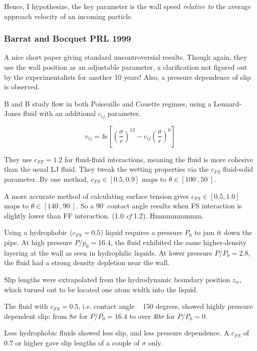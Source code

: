 \documentclass[twocolumn]{article}
\begin{document}
Hence, I hypothesize, the key parameter is the wall speed \emph{relative to} the average approach velocity of an incoming particle. 



\subsubsection*{Barrat and Bocquet PRL 1999}
A nice short paper giving standard uncontroversial results.  Though again, they use the wall position as an adjustable parameter, a clarification not figured out by the experimentalists for another 10 years! Also, a pressure dependence of slip is observed.

B and B study flow in both Poiseuille and Couette regimes, using a Lennard-Jones fluid with an additional $c_{ij}$ parameter.

\[ v_{ij} = 4 \epsilon \left[ \left( \frac{\sigma}{r}\right)^{12} -
    c_{ij} \left( \frac{\sigma}{r} \right)^{6} \right] \]

They use $c_{FF} = 1.2$ for fluid-fluid interactions, meaning the fluid is more cohesive than the usual LJ fluid.  They tweak the wetting properties via the $c_{FS}$ fluid-solid parameter. By one method, $c_{FS} \in \left[0.5, 0.9 \right] $ maps to $\theta \in \left[ 100^{\cdot} , 50^{\cdot} \right] $.

A more accurate method of calculating surface tension gives $c_{FS} \in \left[0.5, 1.0 \right] $ maps to $\theta \in \left[ 140^{\cdot} , 90^{\cdot} \right] $. So a $90^{\cdot}$ contact angle results when FS interaction is slightly lower than FF interaction. (1.0 \emph{cf} 1.2). Hmmmmmmmm.

Using a hydrophobic ($c_{FS} = 0.5$) liquid requires a pressure $P_{0}$ to jam it down the pipe. At high pressure $P/p_{0} = 16.4$, the fluid exhibited the same higher-density layering at the wall as seen in hydrophilic liquids. At lower pressure $P/P_{0} = 2.8$, the fluid had a strong density depletion near the wall.

Slip lengths were extrapolated from the hydrodynamic boundary position $z_{w}$, which turned out to be located one atom width into the liquid.

The fluid with $c_{FS} =0.5$, i.e. contact angle ~ 150 degrees, showed highly pressure dependent slip: from 8$\sigma$ for $P/P_{0}=16.4$ to over 40$\sigma$ for $P/P_{0} \sim 0$.

Less hydrophobic fluids showed less slip, and less pressure dependence. A $c_{FS}$ of 0.7 or higher gave slip lengths of a couple of $\sigma$ only.
\end{document}
